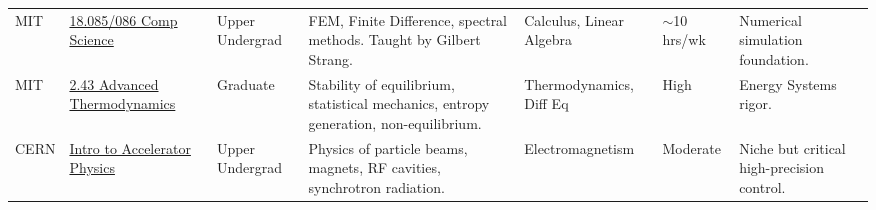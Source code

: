 \documentclass[10pt, a4paper, landscape]{article}
\begin{document}
\begin{longtable}{L{2cm} L{3.5cm} L{1.8cm} L{6cm} L{3.5cm} L{2cm} L{5cm}}
    \addlinespace
    MIT & \href{https://ocw.mit.edu/courses/18-085-computational-science-and-engineering-i-fall-2008/}{18.085/086 Comp Science} & Upper Undergrad & FEM, Finite Difference, spectral methods. Taught by Gilbert Strang. & Calculus, Linear Algebra & $\sim$10 hrs/wk & Numerical simulation foundation. \\
    \addlinespace
    MIT & \href{https://ocw.mit.edu/courses/2-43-advanced-thermodynamics-fall-2019/}{2.43 Advanced Thermodynamics} & Graduate & Stability of equilibrium, statistical mechanics, entropy generation, non-equilibrium. & Thermodynamics, Diff Eq & High & Energy Systems rigor. \\
    \addlinespace
    CERN & \href{https://academic-training.web.cern.ch/}{Intro to Accelerator Physics} & Upper Undergrad & Physics of particle beams, magnets, RF cavities, synchrotron radiation. & Electromagnetism & Moderate & Niche but critical high-precision control. \\


\end{longtable}
\end{document}
